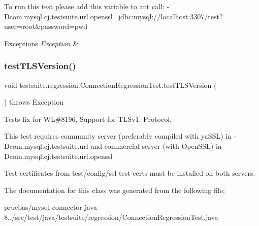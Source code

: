 To run this test please add this variable to ant call\+: -\/\+Dcom.\+mysql.\+cj.\+testsuite.\+url.\+openssl=jdbc\+:mysql\+://localhost\+:3307/test?user=root\&password=pwd


\begin{DoxyExceptions}{Exceptions}
{\em Exception} & \\
\hline
\end{DoxyExceptions}
\mbox{\label{classtestsuite_1_1regression_1_1_connection_regression_test_a8a5b38389d6365d90769f30887196749}} 
\subsubsection{\texorpdfstring{test\+T\+L\+S\+Version()}{testTLSVersion()}}
{\footnotesize\ttfamily void testsuite.\+regression.\+Connection\+Regression\+Test.\+test\+T\+L\+S\+Version (\begin{DoxyParamCaption}{ }\end{DoxyParamCaption}) throws Exception}

Tests fix for WL\#8196, Support for T\+L\+Sv1. Protocol.

This test requires community server (preferably compiled with ya\+S\+SL) in -\/\+Dcom.\+mysql.\+cj.\+testsuite.\+url and commercial server (with Open\+S\+SL) in -\/\+Dcom.\+mysql.\+cj.\+testsuite.\+url.\+openssl

Test certificates from test/config/ssl-\/test-\/certs must be installed on both servers. 

The documentation for this class was generated from the following file\+:\begin{DoxyCompactItemize}
\item 
pruebas/mysql-\/connector-\/java-\/8../src/test/java/testsuite/regression/Connection\+Regression\+Test.\+java\end{DoxyCompactItemize}

